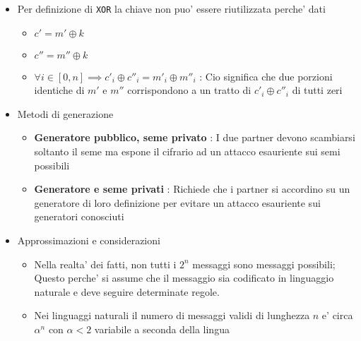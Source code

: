 \begin{itemize}
    \item Per definizione di \texttt{XOR} la chiave non puo' essere riutilizzata perche' dati
    \begin{itemize}
        \item $c' = m' \oplus k$
        \item $c'' = m'' \oplus k$
        \item $\forall i \in [0, n] \implies c'_i \oplus c''_i = m'_i \oplus m''_i$ : Cio significa che due porzioni identiche di $m'$ e $m''$ corrispondono a un tratto di $c'_i \oplus c''_i$ di tutti zeri
    \end{itemize}
    \item Metodi di generazione
    \begin{itemize}
        \item \textbf{Generatore pubblico, seme privato} : I due partner devono scambiarsi soltanto il seme ma espone il cifrario ad un attacco esauriente sui semi possibili
        \item \textbf{Generatore e seme privati} : Richiede che i partner si accordino su un generatore di loro definizione per evitare un attacco esauriente sui generatori conosciuti
    \end{itemize}
    \newpage
    \item Approssimazioni e considerazioni
    \begin{itemize}
        \item Nella realta' dei fatti, non tutti i $2^n$ messaggi sono messaggi possibili; Questo perche' si assume che il messaggio sia codificato in linguaggio naturale e deve seguire determinate regole.
        \item Nei linguaggi naturali il numero di messaggi validi di lunghezza $n$ e' circa $\alpha^n$ con $\alpha < 2$ variabile a seconda della lingua
    \end{itemize}
\end{itemize}